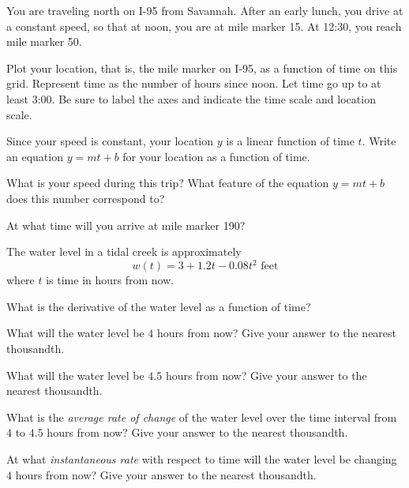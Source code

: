 
You are traveling north on I-95 from Savannah.
After an early lunch, you drive at a constant speed, so that at noon, you are at mile marker 15.
At 12:30, you reach mile marker 50.

\begin{ProblemSet}
 \begin{Problem}[pencil space=0in]
  Plot your location, that is, the mile marker on I-95, as a function of time on this grid.
  Represent time as the number of hours since noon.
  Let time go up to at least 3:00.
  Be sure to label the axes and indicate the time scale and location scale.

  \bigskip
  \GraphingGridSmall

 \end{Problem}
 \begin{Problem}
  Since your speed is constant, your location $y$ is a linear function of time $t$.
  Write an equation $y = m t + b$ for your location as a function of time.
 \end{Problem}
 \begin{Problem}[pencil space=0.5in]
  What is your speed during this trip?
  What feature of the equation $y = m t + b$ does this number correspond to?
 \end{Problem}
 \begin{Problem}[pencil space=0.5in]
  At what time will you arrive at mile marker 190?
 \end{Problem}
\end{ProblemSet}

\newpage
The water level in a tidal creek is approximately
\begin{equation*}
 w(t) = 3 + 1.2 t - 0.08 t^2 \text{ feet}
\end{equation*}
where $t$ is time in hours from now.

\begin{ProblemSet}[pencil space=2in]
 \begin{Problem}
  What is the derivative of the water level as a function of time?
 \end{Problem}
 \begin{Problem}
  What will the water level be $4$ hours from now?
  Give your answer to the nearest thousandth.
 \end{Problem}
 \begin{Problem}
  What will the water level be $4.5$ hours from now?
  Give your answer to the nearest thousandth.
 \end{Problem}
 \begin{Problem}
  What is the \emph{average rate of change} of the water level over the time interval from $4$ to $4.5$ hours from now?
  Give your answer to the nearest thousandth.
 \end{Problem}
 \begin{Problem}
  At what \emph{instantaneous rate} with respect to time will the water level be changing $4$ hours from now?
  Give your answer to the nearest thousandth.
 \end{Problem}
\end{ProblemSet}

